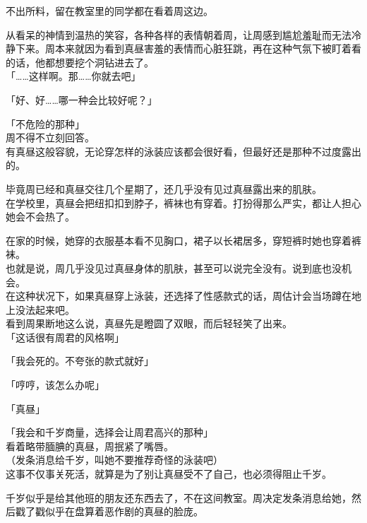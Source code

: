 不出所料，留在教室里的同学都在看着周这边。

从看呆的神情到温热的笑容，各种各样的表情朝着周，让周感到尴尬羞耻而无法冷静下来。周本来就因为看到真昼害羞的表情而心脏狂跳，再在这种气氛下被盯着看的话，他都想要挖个洞钻进去了。\\

「……这样啊。那……你就去吧」

「好、好……哪一种会比较好呢？」

「不危险的那种」\\

周不得不立刻回答。\\

有真昼这般容貌，无论穿怎样的泳装应该都会很好看，但最好还是那种不过度露出的。

毕竟周已经和真昼交往几个星期了，还几乎没有见过真昼露出来的肌肤。\\

在学校里，真昼会把纽扣扣到脖子，裤袜也有穿着。打扮得那么严实，都让人担心她会不会热了。

在家的时候，她穿的衣服基本看不见胸口，裙子以长裙居多，穿短裤时她也穿着裤袜。\\

也就是说，周几乎没见过真昼身体的肌肤，甚至可以说完全没有。说到底也没机会。\\

在这种状况下，如果真昼穿上泳装，还选择了性感款式的话，周估计会当场蹲在地上没法起来吧。\\

看到周果断地这么说，真昼先是瞪圆了双眼，而后轻轻笑了出来。\\

「这话很有周君的风格啊」

「我会死的。不夸张的款式就好」

「哼哼，该怎么办呢」

「真昼」

「我会和千岁商量，选择会让周君高兴的那种」\\

看着略带腼腆的真昼，周抿紧了嘴唇。\\

（发条消息给千岁，叫她不要推荐奇怪的泳装吧）\\

这事不仅事关死活，就算是为了别让真昼受不了自己，也必须得阻止千岁。

千岁似乎是给其他班的朋友还东西去了，不在这间教室。周决定发条消息给她，然后戳了戳似乎在盘算着恶作剧的真昼的脸庞。
